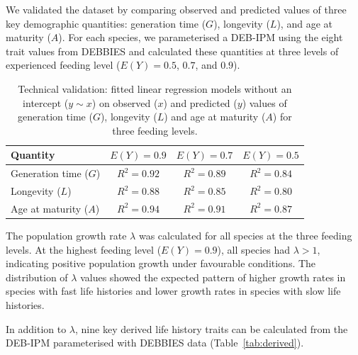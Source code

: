 \documentclass[11pt]{article}
\begin{document}
We validated the dataset by comparing observed and predicted values of three key demographic quantities: generation time ($G$), longevity ($L$), and age at maturity ($A$). For each species, we parameterised a DEB-IPM using the eight trait values from DEBBIES and calculated these quantities at three levels of experienced feeding level ($E(Y) = 0.5$, $0.7$, and $0.9$).

\begin{table}[htbp]
\centering
\caption{Technical validation: fitted linear regression models without an intercept ($y \sim x$) on observed ($x$) and predicted ($y$) values of generation time ($G$), longevity ($L$) and age at maturity ($A$) for three feeding levels.}
\label{tab:validation}
\begin{tabular}{lccc}
\toprule
\textbf{Quantity} & \textbf{$E(Y) = 0.9$} & \textbf{$E(Y) = 0.7$} & \textbf{$E(Y) = 0.5$} \\
\midrule
Generation time ($G$) & $R^2 = 0.92$ & $R^2 = 0.89$ & $R^2 = 0.84$ \\
Longevity ($L$) & $R^2 = 0.88$ & $R^2 = 0.85$ & $R^2 = 0.80$ \\
Age at maturity ($A$) & $R^2 = 0.94$ & $R^2 = 0.91$ & $R^2 = 0.87$ \\
\bottomrule
\end{tabular}
\end{table}

The population growth rate $\lambda$ was calculated for all species at the three feeding levels. At the highest feeding level ($E(Y) = 0.9$), all species had $\lambda > 1$, indicating positive population growth under favourable conditions. The distribution of $\lambda$ values showed the expected pattern of higher growth rates in species with fast life histories and lower growth rates in species with slow life histories.

In addition to $\lambda$, nine key derived life history traits can be calculated from the DEB-IPM parameterised with DEBBIES data (Table~\ref{tab:derived}).
\end{document}
